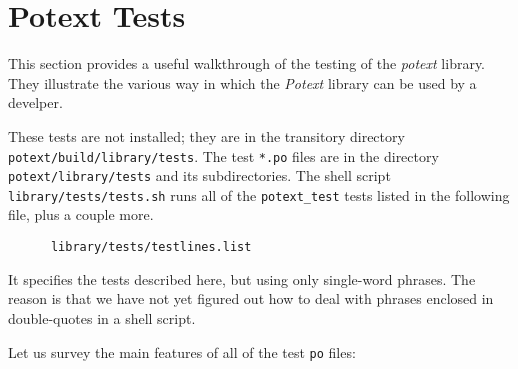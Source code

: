 %
%
%

\section{Potext Tests}
\label{sec:potext_tests}

   This section provides a useful walkthrough of the testing
   of the \textsl{potext} library.
   They illustrate the various way in which the \textsl{Potext} library
   can be used by a develper.

   These tests are not installed; they are in the transitory
   directory \texttt{potext/build/library/tests}.
   The test \texttt{*.po} files are in the 
   directory \texttt{potext/library/tests} and its subdirectories.
   The shell script
   \texttt{library/tests/tests.sh} runs all of the
   \texttt{potext\_test} tests listed in the following file,
   plus a couple more.

   \begin{verbatim}
      library/tests/testlines.list
   \end{verbatim}

   It specifies the tests
   described here, but using only single-word phrases.
   The reason is that we have not yet figured out how to deal
   with phrases enclosed in double-quotes in a shell script.

   Let us survey the main features of all of the test \texttt{po}
   files:

